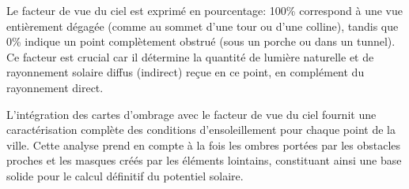 \par{Le facteur de vue du ciel est exprimé en pourcentage: 100\% correspond à une vue entièrement dégagée (comme au sommet d'une tour ou d'une colline), tandis que 0\% indique un point complètement obstrué (sous un porche ou dans un tunnel). Ce facteur est crucial car il détermine la quantité de lumière naturelle et de rayonnement solaire diffus (indirect) reçue en ce point, en complément du rayonnement direct.}
\par{L'intégration des cartes d'ombrage avec le facteur de vue du ciel fournit une caractérisation complète des conditions d'ensoleillement pour chaque point de la ville. Cette analyse prend en compte à la fois les ombres portées par les obstacles proches et les masques créés par les éléments lointains, constituant ainsi une base solide pour le calcul définitif du potentiel solaire.}

